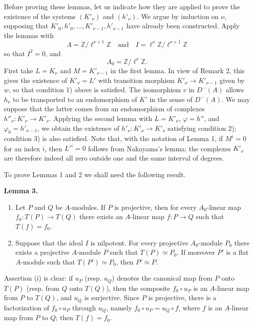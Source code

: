 \documentclass[11pt]{article}
\newenvironment{statement}[1]{\par\medskip\noindent\textbf{#1.}\ }{\par\medskip}
\begin{document}
Before proving these lemmas, let us indicate how they are applied to prove the existence of the systems $(K'_\nu)$ and $(h'_\nu)$. We argue by induction on $\nu$, supposing that $K'_0,h'_0,\ldots,K'_{\nu-1},h'_{\nu-1}$ have already been constructed. Apply the lemmas with
\[
A=\mathbb Z/\ell^{\nu+1}\mathbb Z
\quad\text{and}\quad
I=\ell^\nu\mathbb Z/\ell^{\nu+1}\mathbb Z
\]
so that $I^2=0$, and
\[
A_0=\mathbb Z/\ell^\nu\mathbb Z.
\]
First take $L=K_\nu$ and $M=K'_{\nu-1}$ in the first lemma. In view of Remark 2, this gives the existence of $K'_\nu=L'$ with transition morphism $K'_\nu\to K'_{\nu-1}$ given by $w$, so that condition 1) above is satisfied. The isomorphism $v$ in $D^-(A)$ allows $h_\nu$ to be transported to an endomorphism of $K'$ in the sense of $D^-(A)$. We may suppose that the latter comes from an endomorphism of complexes $h''_\nu:K'_\nu\to K'_\nu$. Applying the second lemma with $L=K'_\nu$, $\varphi=h''$, and $\varphi_0=h'_{\nu-1}$, we obtain the existence of $h'_\nu:K'_\nu\to K'_\nu$ satisfying condition 2); condition 3) is also satisfied. Note that, with the notation of Lemma 1, if $M^i=0$ for an index $i$, then $L'^i=0$ follows from Nakayama's lemma; the complexes $K'_\nu$ are therefore indeed all zero outside one and the same interval of degrees.

To prove Lemmas 1 and 2 we shall need the following result.

\begin{statement}{Lemma 3}
\begin{enumerate}[label=(\roman*)]
\item Let $P$ and $Q$ be $A$-modules. If $P$ is projective, then for every $A_0$-linear map $f_0:T(P)\to T(Q)$ there exists an $A$-linear map $f:P\to Q$ such that $T(f)=f_0$.
\item Suppose that the ideal $I$ is nilpotent. For every projective $A_0$-module $P_0$ there exists a projective $A$-module $P$ such that $T(P)\simeq P_0$. If moreover $P'$ is a flat $A$-module such that $T(P')\simeq P_0$, then $P'\simeq P$.
\end{enumerate}
\end{statement}

Assertion (i) is clear: if $u_P$ (resp. $u_Q$) denotes the canonical map from $P$ onto $T(P)$ (resp. from $Q$ onto $T(Q)$), then the composite $f_0\circ u_P$ is an $A$-linear map from $P$ to $T(Q)$, and $u_Q$ is surjective. Since $P$ is projective, there is a factorization of $f_0\circ u_P$ through $u_Q$, namely $f_0\circ u_P=u_Q\circ f$, where $f$ is an $A$-linear map from $P$ to $Q$; then $T(f)=f_0$.
\end{document}
